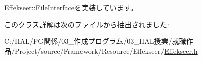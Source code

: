 \mbox{\hyperlink{class_effekseer_1_1_file_interface_a1e60cb81a5cae39b37e44570ef693d91}{Effekseer\+::\+File\+Interface}}を実装しています。



このクラス詳解は次のファイルから抽出されました\+:\begin{DoxyCompactItemize}
\item 
C\+:/\+H\+A\+L/\+P\+G関係/03\+\_\+作成プログラム/03\+\_\+\+H\+A\+L授業/就職作品/\+Project/source/\+Framework/\+Resource/\+Effekseer/\mbox{\hyperlink{_effekseer_8h}{Effekseer.\+h}}\end{DoxyCompactItemize}
